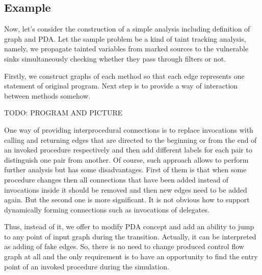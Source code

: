 \subsection{Example}

Now, let's consider the construction of a simple analysis including definition of graph and PDA.
Let the sample problem be a kind of taint tracking analysis, namely, we propagate tainted variables from marked sources to the vulnerable sinks simultaneously checking whether they pass through filters or not.

Firstly, we construct graphs of each method so that each edge represents one statement of original program.
Next step is to provide a way of interaction between methods somehow.

TODO: PROGRAM AND PICTURE

One way of providing interprocedural connections is to replace invocations with calling and returning edges that are directed to the beginning or from the end of an invoked procedure respectively and then add different labels for each pair to distinguish one pair from another.
Of course, such approach allows to perform further analysis but has some disadvantages.
First of them is that when some procedure changes then all connections that have been added instead of invocations inside it should be removed and then new edges need to be added again.
But the second one is more significant.
It is not obvious how to support dynamically forming connections such as invocations of delegates.

Thus, instead of it, we offer to modify PDA concept and add an ability to jump to any point of input graph during the transition.
Actually, it can be interpreted as adding of fake edges.
So, there is no need to change produced control flow graph at all and the only requirement is to have an opportunity to find the entry point of an invoked procedure during the simulation.


